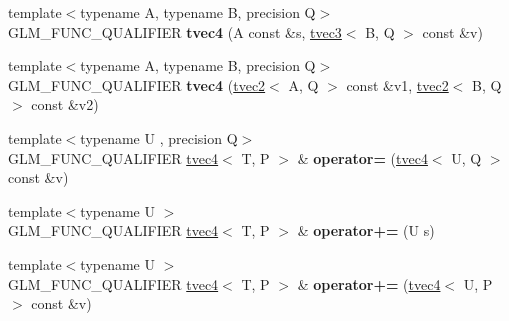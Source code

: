 \begin{DoxyCompactItemize}
\item 
\hypertarget{structglm_1_1detail_1_1tvec4_aea55658ec0e7bb02b83a8cc618de125c}{{\footnotesize template$<$typename A, typename B, precision Q$>$ }\\G\-L\-M\-\_\-\-F\-U\-N\-C\-\_\-\-Q\-U\-A\-L\-I\-F\-I\-E\-R {\bfseries tvec4} (A const \&s, \hyperlink{structglm_1_1detail_1_1tvec3}{tvec3}$<$ B, Q $>$ const \&v)}\label{structglm_1_1detail_1_1tvec4_aea55658ec0e7bb02b83a8cc618de125c}

\item 
\hypertarget{structglm_1_1detail_1_1tvec4_a5ae1182faaf5b3409da227032738f74a}{{\footnotesize template$<$typename A, typename B, precision Q$>$ }\\G\-L\-M\-\_\-\-F\-U\-N\-C\-\_\-\-Q\-U\-A\-L\-I\-F\-I\-E\-R {\bfseries tvec4} (\hyperlink{structglm_1_1detail_1_1tvec2}{tvec2}$<$ A, Q $>$ const \&v1, \hyperlink{structglm_1_1detail_1_1tvec2}{tvec2}$<$ B, Q $>$ const \&v2)}\label{structglm_1_1detail_1_1tvec4_a5ae1182faaf5b3409da227032738f74a}

\item 
\hypertarget{structglm_1_1detail_1_1tvec4_ab4a4d05d0c40397a25fdb2c2a5c4cd3f}{{\footnotesize template$<$typename U , precision Q$>$ }\\G\-L\-M\-\_\-\-F\-U\-N\-C\-\_\-\-Q\-U\-A\-L\-I\-F\-I\-E\-R \hyperlink{structglm_1_1detail_1_1tvec4}{tvec4}$<$ T, P $>$ \& {\bfseries operator=} (\hyperlink{structglm_1_1detail_1_1tvec4}{tvec4}$<$ U, Q $>$ const \&v)}\label{structglm_1_1detail_1_1tvec4_ab4a4d05d0c40397a25fdb2c2a5c4cd3f}

\item 
\hypertarget{structglm_1_1detail_1_1tvec4_a6dcf29c92985638ec2b9b126efbe6f34}{{\footnotesize template$<$typename U $>$ }\\G\-L\-M\-\_\-\-F\-U\-N\-C\-\_\-\-Q\-U\-A\-L\-I\-F\-I\-E\-R \hyperlink{structglm_1_1detail_1_1tvec4}{tvec4}$<$ T, P $>$ \& {\bfseries operator+=} (U s)}\label{structglm_1_1detail_1_1tvec4_a6dcf29c92985638ec2b9b126efbe6f34}

\item 
\hypertarget{structglm_1_1detail_1_1tvec4_a90b24c30c735740c53e5549eb7c698b1}{{\footnotesize template$<$typename U $>$ }\\G\-L\-M\-\_\-\-F\-U\-N\-C\-\_\-\-Q\-U\-A\-L\-I\-F\-I\-E\-R \hyperlink{structglm_1_1detail_1_1tvec4}{tvec4}$<$ T, P $>$ \& {\bfseries operator+=} (\hyperlink{structglm_1_1detail_1_1tvec4}{tvec4}$<$ U, P $>$ const \&v)}\label{structglm_1_1detail_1_1tvec4_a90b24c30c735740c53e5549eb7c698b1}


\end{DoxyCompactItemize}
